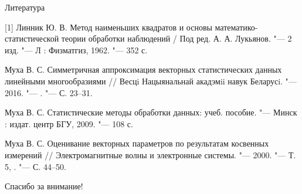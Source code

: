 \documentclass[hyperref={pdftex,unicode}]{beamer}
\begin{document}
\begin{frame}[fragile]{Литература}
  \small{
    [1] Линник Ю. В. Метод наименьших квадратов и основы
    математико-статистической теории обработки наблюдений /
    Под ред. А. А. Лукьянов.
    "--- 2 изд.
    "--- Л : Физматгиз, 1962.
    "--- 352 с.

    \bigskip
    [2] Муха В. С. Симметричная аппроксимация векторных
    статистических данных линейными многообразиями // Весцi
    Нацыянальнай акадэмii навук Беларусi.
    "--- 2016.
    "--- .
    "--- С. 23--31.

    \bigskip
    [3] Муха В. С. Статистические методы обработки данных:
    учеб. пособие.
    "--- Минск : издат. центр БГУ, 2009.
    "--- 108 с.

    \bigskip
    [4] Муха В. С. Оценивание векторных параметров по результатам
    косвенных измерений // Электромагнитные волны и
    электронные системы.
    "--- 2000.
    "--- Т. 5, .
    "--- С. 44--50.
  }
\end{frame}

\begin{frame}
  \centering
  Спасибо за внимание!
\end{frame}
\end{document}
